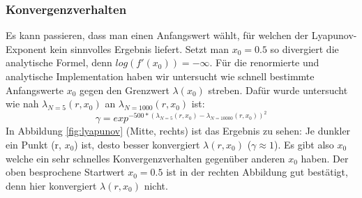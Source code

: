 \documentclass[12pt,a4paper]{article}
\begin{document}
\subsubsection{Konvergenzverhalten}
Es kann passieren, dass man einen Anfangswert wählt, für welchen der Lyapunov-Exponent kein sinnvolles Ergebnis liefert. Setzt man $x_0=0.5$ so divergiert die analytische Formel, denn $log(f'(x_0))=-\infty$.
Für die renormierte und analytische Implementation haben wir untersucht wie schnell bestimmte Anfangswerte $x_0$ gegen den Grenzwert $\lambda(x_0)$ streben. Dafür wurde untersucht wie nah $\lambda_{N=5}(r, x_0)$ an $\lambda_{N=1000}(r, x_0)$ ist:
\begin{equation}
    \gamma = exp^{-500 * (\lambda_{N=5}(r,x_0)
    - \lambda_{N=10000}(r,x_0))^2}
\end{equation}
In Abbildung \ref{fig:lyapunov} (Mitte, rechts) ist das Ergebnis zu sehen: Je dunkler ein Punkt (r, $x_0$) ist, desto besser konvergiert $\lambda(r, x_0)$ ($\gamma \approx 1$). 
Es gibt also $x_0$ welche ein sehr schnelles Konvergenzverhalten gegenüber anderen $x_0$ haben. Der oben besprochene Startwert $x_0=0.5$ ist in der rechten Abbildung gut bestätigt, denn hier konvergiert $\lambda(r, x_0)$ nicht. 
\end{document}
